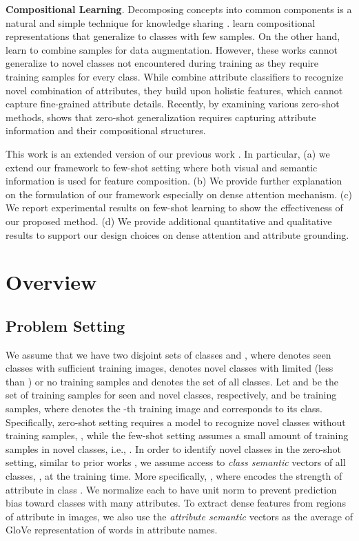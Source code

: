 \documentclass[10pt,journal,compsoc]{IEEEtran}
\newcommand{\1}{\boldsymbol{1}}
\newcommand{\0}{\boldsymbol{0}}
\newcommand{\<}{\langle}
\renewcommand{\>}{\rangle}
\newcommand{\myparagraph}[1]{\vspace{-2pt}\medskip\noindent\textbf{#1}}
\begin{document}
\myparagraph{Compositional Learning}. Decomposing concepts into common components is a natural and simple technique for knowledge sharing \cite{Lake:Science15,Lampert:PAMI13,Farhadi:CVPR09,Russakovsky:ECCVW10}.
\cite{Tokmakov:ICCV19,Andreas:ICLR19} learn compositional representations that generalize to classes with few samples. On the other hand, \cite{Chen:CVPR19ImgDeform,Zhang:ICLR18} learn to combine samples for data augmentation. However, these works cannot generalize to novel classes not encountered during training as they require training samples for every class. While \cite{Misra:CVPR17,Kato:ECCV18,Purushwalkam:ICCV19,Yang:CVPR20,Atzmon:NeurIPS20} combine attribute classifiers to recognize novel combination of attributes, they build upon holistic features, which cannot capture fine-grained attribute details. Recently, by examining various zero-shot methods, \cite{Sylvain:ICLR20} shows that zero-shot generalization requires capturing attribute information and their compositional structures.

\myparagraph{}
This work is an extended version of our previous work \cite{Huynh:NeurIPS20,Huynh-finegrained:CVPR20}. In particular, (a) we extend our framework to few-shot setting where both visual and semantic information is used for feature composition. (b) We provide further explanation on the formulation of our framework especially on dense attention mechanism. (c) We report experimental results on few-shot learning to show the effectiveness of our proposed method. (d) We provide additional quantitative and qualitative results to support our design choices on dense attention and attribute grounding.

\section{Overview}
\label{sec:overview}
\subsection{Problem Setting}
We assume that we have two disjoint sets of classes  and , where  denotes seen classes with sufficient training images,  denotes novel classes with limited (less than ) or no training samples and  denotes the set of all classes. Let  and  be the set of training samples for seen and novel classes, respectively, and  be  training samples, where  denotes the -th training image and  corresponds to its class.
Specifically, zero-shot setting requires a model to  recognize novel classes without training samples, , while the few-shot setting assumes a small amount of training samples in novel classes, i.e., .
In order to identify novel classes in the zero-shot setting, similar to prior works \cite{Xian:CVPR19,Schonfeld:CVPR19,Zhu:ICCV19}, we assume access to \emph{class semantic} vectors of all classes, , at the training time. More specifically, , where  encodes the strength of attribute  in class . We normalize each  to have unit norm to prevent prediction bias toward classes with many attributes. To extract dense features from regions of attribute in images, we also use the \textit{attribute semantic} vectors  as the average of GloVe representation \cite{Pennington:EMNLP14} of words in attribute names. 
\end{document}
